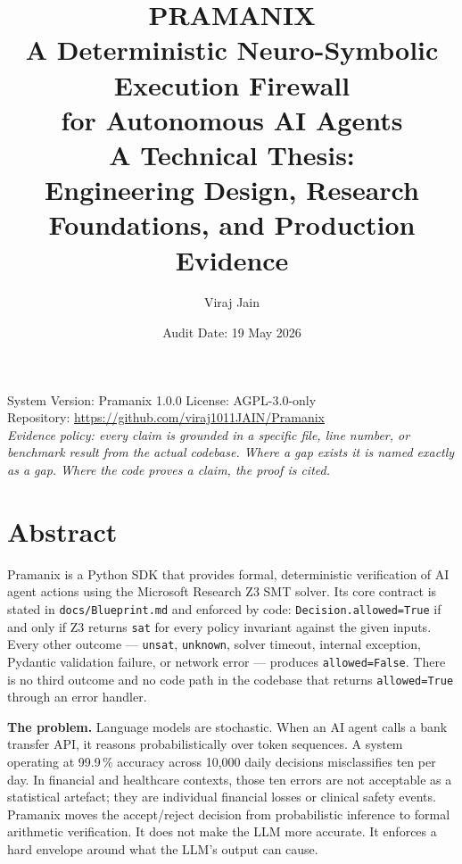 \documentclass[12pt,a4paper,oneside]{report}
\title{%
  \Huge\bfseries PRAMANIX\\[0.6em]
  \Large A Deterministic Neuro-Symbolic Execution Firewall\\[0.3em]
  for Autonomous AI Agents\\[1.2em]
  \large A Technical Thesis:\\
  Engineering Design, Research Foundations, and Production Evidence
}
\author{Viraj Jain}
\date{Audit Date: 19 May 2026}
\newcommand{\fname}[1]{\texttt{#1}}          %
\newcommand{\code}[1]{\texttt{#1}}           %
\begin{document}

\maketitle
\thispagestyle{empty}

\vfill
\begin{center}
  \small
  System Version: Pramanix 1.0.0 \quad\textbullet\quad License: AGPL-3.0-only\\[0.4em]
  Repository: \url{https://github.com/viraj1011JAIN/Pramanix}\\[1em]
  \textit{Evidence policy: every claim is grounded in a specific file, line number, or\\
  benchmark result from the actual codebase. Where a gap exists it is named exactly\\
  as a gap. Where the code proves a claim, the proof is cited.}
\end{center}

\newpage

\chapter*{Abstract}

Pramanix is a Python SDK that provides formal, deterministic verification of
AI agent actions using the Microsoft Research Z3 SMT solver.  Its core
contract is stated in \fname{docs/Blueprint.md} and enforced by code:
\code{Decision.allowed=True} if and only if Z3 returns \code{sat} for every
policy invariant against the given inputs.  Every other outcome ---
\code{unsat}, \code{unknown}, solver timeout, internal exception, Pydantic
validation failure, or network error --- produces \code{allowed=False}.
There is no third outcome and no code path in the codebase that returns
\code{allowed=True} through an error handler.

\textbf{The problem.}  Language models are stochastic.  When an AI agent
calls a bank transfer API, it reasons probabilistically over token sequences.
A system operating at 99.9\,\% accuracy across 10,000 daily decisions
misclassifies ten per day.  In financial and healthcare contexts, those ten
errors are not acceptable as a statistical artefact; they are individual
financial losses or clinical safety events.  Pramanix moves the accept/reject
decision from probabilistic inference to formal arithmetic verification.  It
does not make the LLM more accurate.  It enforces a hard envelope around what
the LLM's output can cause.
\end{document}

